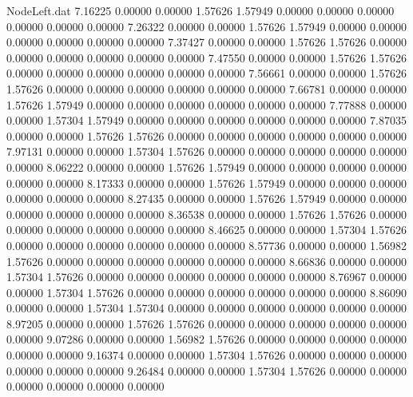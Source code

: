 \begin{filecontents}{NodeLeft.dat}
   7.16225    0.00000    0.00000     1.57626    1.57949    0.00000    0.00000    0.00000    0.00000    0.00000    0.00000
   7.26322    0.00000    0.00000     1.57626    1.57949    0.00000    0.00000    0.00000    0.00000    0.00000    0.00000
   7.37427    0.00000    0.00000     1.57626    1.57626    0.00000    0.00000    0.00000    0.00000    0.00000    0.00000
   7.47550    0.00000    0.00000     1.57626    1.57626    0.00000    0.00000    0.00000    0.00000    0.00000    0.00000
   7.56661    0.00000    0.00000     1.57626    1.57626    0.00000    0.00000    0.00000    0.00000    0.00000    0.00000
   7.66781    0.00000    0.00000     1.57626    1.57949    0.00000    0.00000    0.00000    0.00000    0.00000    0.00000
   7.77888    0.00000    0.00000     1.57304    1.57949    0.00000    0.00000    0.00000    0.00000    0.00000    0.00000
   7.87035    0.00000    0.00000     1.57626    1.57626    0.00000    0.00000    0.00000    0.00000    0.00000    0.00000
   7.97131    0.00000    0.00000     1.57304    1.57626    0.00000    0.00000    0.00000    0.00000    0.00000    0.00000
   8.06222    0.00000    0.00000     1.57626    1.57949    0.00000    0.00000    0.00000    0.00000    0.00000    0.00000
   8.17333    0.00000    0.00000     1.57626    1.57949    0.00000    0.00000    0.00000    0.00000    0.00000    0.00000
   8.27435    0.00000    0.00000     1.57626    1.57949    0.00000    0.00000    0.00000    0.00000    0.00000    0.00000
   8.36538    0.00000    0.00000     1.57626    1.57626    0.00000    0.00000    0.00000    0.00000    0.00000    0.00000
   8.46625    0.00000    0.00000     1.57304    1.57626    0.00000    0.00000    0.00000    0.00000    0.00000    0.00000
   8.57736    0.00000    0.00000     1.56982    1.57626    0.00000    0.00000    0.00000    0.00000    0.00000    0.00000
   8.66836    0.00000    0.00000     1.57304    1.57626    0.00000    0.00000    0.00000    0.00000    0.00000    0.00000
   8.76967    0.00000    0.00000     1.57304    1.57626    0.00000    0.00000    0.00000    0.00000    0.00000    0.00000
   8.86090    0.00000    0.00000     1.57304    1.57304    0.00000    0.00000    0.00000    0.00000    0.00000    0.00000
   8.97205    0.00000    0.00000     1.57626    1.57626    0.00000    0.00000    0.00000    0.00000    0.00000    0.00000
   9.07286    0.00000    0.00000     1.56982    1.57626    0.00000    0.00000    0.00000    0.00000    0.00000    0.00000
   9.16374    0.00000    0.00000     1.57304    1.57626    0.00000    0.00000    0.00000    0.00000    0.00000    0.00000
   9.26484    0.00000    0.00000     1.57304    1.57626    0.00000    0.00000    0.00000    0.00000    0.00000    0.00000

\end{filecontents}

